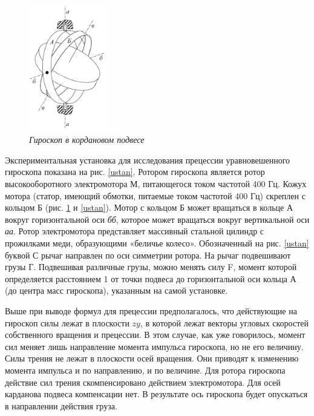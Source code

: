 \documentclass[a4paper,12pt]{article}
\begin{document}
\begin{figure}[h!]
        \centering
	\includegraphics[width=0.3\textwidth]{giroscope.png}
	\caption{\textit{Гироскоп в кордановом подвесе}}
	\label{giroscope}
\end{figure}

Экспериментальная установка для исследования прецессии уравновешенного гироскопа показана на рис. \ref{ustan}. Ротором гироскопа является ротор высокооборотного электромотора М, питающегося током частотой 400 Гц. Кожух мотора (статор, имеющий обмотки, питаемые током частотой 400 Гц) скреплен с кольцом Б (рис. \ref{giroscope} и \ref{ustan}). Мотор с кольцом Б может вращаться в кольце А вокруг горизонтальной оси \textit{бб}, которое может вращаться вокруг вертикальной оси \textit{аа}. Ротор электромотора представляет массивный стальной цилиндр с прожилками меди, образующими «беличье колесо». Обозначенный на рис. \ref{ustan} буквой С рычаг направлен по оси симметрии ротора. На рычаг подвешивают грузы Г. Подвешивая различные грузы, можно менять силу F, момент которой определяется расстоянием 1 от точки подвеса до горизонтальной оси кольца А (до центра масс гироскопа), указанным на самой установке. 

Выше при выводе формул для прецессии предполагалось, что действующие на гироскоп силы лежат в плоскости $zy$, в которой лежат векторы угловых скоростей собственного вращения и прецессии. В этом случае, как уже говорилось, момент сил меняет лишь направление момента импульса гироскопа, но не его величину. Силы трения не лежат в плоскости осей вращения. Они приводят к изменению момента импульса и по направлению, и по величине. Для ротора гироскопа действие сил трения скомпенсировано действием электромотора. Для осей карданова подвеса компенсации нет. В результате ось гироскопа будет опускаться в направлении действия груза.
\end{document}
